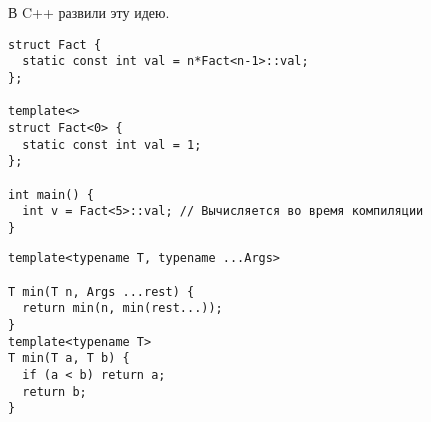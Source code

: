 В C++ развили эту идею.
\begin{verbatim}
struct Fact {
  static const int val = n*Fact<n-1>::val;
};

template<>
struct Fact<0> {
  static const int val = 1;
};

int main() {
  int v = Fact<5>::val; // Вычисляется во время компиляции
}
\end{verbatim}

\begin{verbatim}
template<typename T, typename ...Args>

T min(T n, Args ...rest) {
  return min(n, min(rest...));
}
template<typename T>
T min(T a, T b) {
  if (a < b) return a;
  return b;
}
\end{verbatim}
